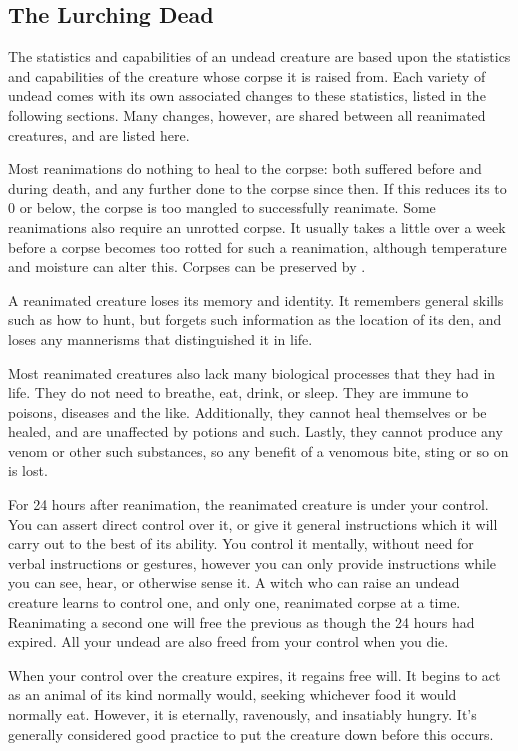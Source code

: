 \subsection{The Lurching Dead}

The statistics and capabilities of an undead creature are based upon the statistics and capabilities of the creature whose corpse it is raised from.
Each variety of undead comes with its own associated changes to these statistics, listed in the following sections.
Many changes, however, are shared between all reanimated creatures, and are listed here.

Most reanimations do nothing to heal {\damage} to the corpse: both {\damage} suffered before and during death, and any further {\damage} done to the corpse since then.
If this reduces its  to 0 or below, the corpse is too mangled to successfully reanimate.
Some reanimations also require an unrotted corpse.
It usually takes a little over a week before a corpse becomes too rotted for such a reanimation, although temperature and moisture can alter this.
Corpses can be preserved by {\embalming}.

A reanimated creature loses its memory and identity.
It remembers general skills such as how to hunt, but forgets such information as the location of its den, and loses any mannerisms that distinguished it in life.

Most reanimated creatures also lack many biological processes that they had in life.
They do not need to breathe, eat, drink, or sleep.
They are immune to poisons, diseases and the like.
Additionally, they cannot heal themselves or be healed, and are unaffected by potions and such.
Lastly, they cannot produce any venom or other such substances, so any benefit of a venomous bite, sting or so on is lost.

For 24 hours after reanimation, the reanimated creature is under your control.
You can assert direct control over it, or give it general instructions which it will carry out to the best of its ability.
You control it mentally, without need for verbal instructions or gestures, however you can only provide instructions while you can see, hear, or otherwise sense it.
A witch who can raise an undead creature learns to control one, and only one, reanimated corpse at a time.
Reanimating a second one will free the previous as though the 24 hours had expired.
All your undead are also freed from your control when you die.

When your control over the creature expires, it regains free will.
It begins to act as an animal of its kind normally would, seeking whichever food it would normally eat.
However, it is eternally, ravenously, and insatiably hungry.
It's generally considered good practice to put the creature down before this occurs.

